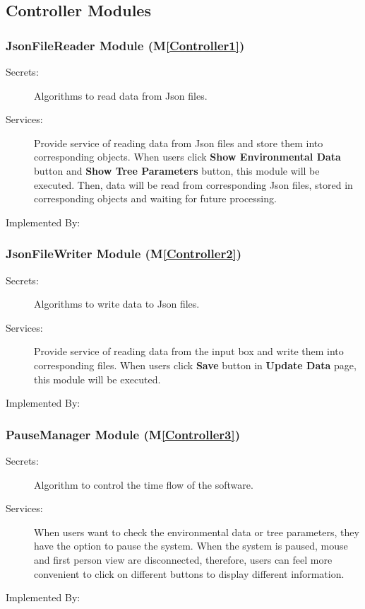 \documentclass[12pt, titlepage]{article}
\newcommand{\mref}[1]{M\ref{#1}}
\begin{document}
\subsection{Controller Modules}

\subsubsection{JsonFileReader Module (\mref{Controller1})}
\begin{description}
\item[Secrets:] Algorithms to read data from Json files.
\item[Services:] Provide service of reading data from Json files and store them into 
corresponding objects. When users click \textbf{Show Environmental Data} button and 
\textbf{Show Tree Parameters} button, this module will be executed. Then, data will be read
from corresponding Json files, stored in corresponding objects and waiting for future 
processing. 
\item[Implemented By:] \progname{}
\end{description}

\subsubsection{JsonFileWriter Module (\mref{Controller2})}
\begin{description}
\item[Secrets:] Algorithms to write data to Json files.
\item[Services:] Provide service of reading data from the input box and write them into 
corresponding files. When users click \textbf{Save} button in \textbf{Update Data} page, 
this module will be executed.
\item[Implemented By:] \progname{}
\end{description}

\subsubsection{PauseManager Module (\mref{Controller3})}
\begin{description}
\item[Secrets:] Algorithm to control the time flow of the software.
\item[Services:] When users want to check the environmental data or tree parameters, they
have the option to pause the system. When the system is paused, mouse and first person view
are disconnected, therefore, users can feel more convenient to click on different buttons
to display different information.  
\item[Implemented By:] \progname{}
\end{description}
\end{document}
